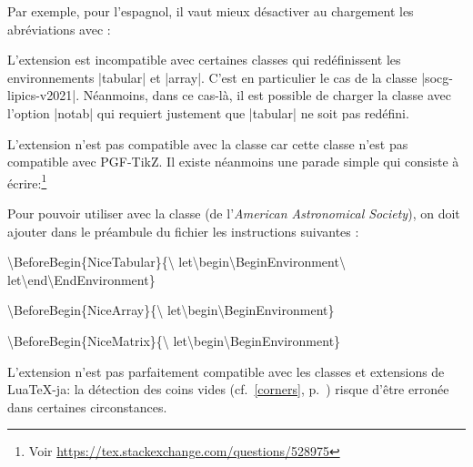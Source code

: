 \documentclass[dvipsnames]{article}
\begin{document}
Par exemple, pour l'espagnol, il vaut mieux désactiver au chargement les
abréviations avec :

\begin{Code}[annotation = false]
\usepackage[spanish,es-noshorthands]{babel}
\end{Code}

\medskip
L'extension  est incompatible avec certaines classes qui
redéfinissent les environnements |{tabular}| et |{array}|. C'est en particulier
le cas de la classe |socg-lipics-v2021|. Néanmoins, dans ce cas-là, il est
possible de charger la classe avec l'option |notab| qui requiert justement que
|{tabular}| ne soit pas redéfini.


\medskip
L'extension  n'est pas compatible avec la classe 
car cette classe n'est pas compatible avec PGF-TikZ. Il existe néanmoins une
parade simple qui consiste à écrire:\footnote{Voir
  \url{https://tex.stackexchange.com/questions/528975}}

\nobreak
{}



\medskip
Pour pouvoir utiliser  avec la classe  (de
l'\emph{American Astronomical Society}), on doit ajouter dans le préambule du
fichier les instructions suivantes :

\begin{scope}\ttfamily \color{gray}
\textbackslash BeforeBegin\{NiceTabular\}\{\textbackslash
let\textbackslash begin\textbackslash BeginEnvironment\textbackslash
let\textbackslash end\textbackslash EndEnvironment\}

\textbackslash BeforeBegin\{NiceArray\}\{\textbackslash
let\textbackslash begin\textbackslash BeginEnvironment\}

\textbackslash BeforeBegin\{NiceMatrix\}\{\textbackslash
let\textbackslash begin\textbackslash BeginEnvironment\}
\end{scope}


\medskip
L'extension  n'est pas parfaitement compatible avec les classes
et extensions de LuaTeX-ja: la détection des coins vides
(cf.~\ref{corners}, p.~\pageref{corners}) risque d'être
erronée dans certaines circonstances.
\end{document}
